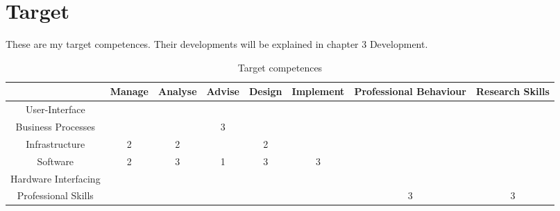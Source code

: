 \section{Target}
These are my target competences. Their developments will be explained in chapter 3 Development.

\begin{table}[htb]
	\centering
	\label{my-label}
	\begin{tabular}{|c|c|c|c|c|c|c|c|}
		\hline
		& Manage & Analyse & Advise & Design & Implement & Professional Behaviour & Research Skills \\ \hline
		User-Interface 			& & & & & & & \\ \hline
		Business Processes 		& & &\cellcolor[HTML]{FD6864}3& & & & \\ \hline
		Infrastructure 			&2&2& &2& & & \\ \hline
		Software 				&2&\cellcolor[HTML]{FD6864}3&1&\cellcolor[HTML]{FD6864}3&3& & \\ \hline
		Hardware Interfacing 	& & & & & & & \\ \hline
		Professional Skills  	& & & & & &\cellcolor[HTML]{FD6864}3&3 \\ \hline
	\end{tabular}
	\caption{Target competences}
\end{table}